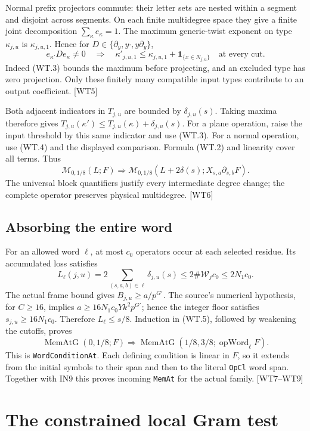 \documentclass[11pt,a4paper]{article}
\numberwithin{equation}{section}
\theoremstyle{remark}\newtheorem{remark}[theorem]{Remark}
\begin{document}
Normal prefix projectors commute: their letter sets are nested within a
segment and disjoint across segments. On each finite multidegree space
they give a finite joint decomposition $\sum_\kappa e_\kappa=1$.
The maximum generic-twist exponent on type $\kappa_{j,u}$ is
$\kappa_{j,u,1}$. Hence for
$D\in\{\partial_y,y\cdot,y\partial_y\}$,
\[
 e_{\kappa'}D e_\kappa\ne0
 \quad\Longrightarrow\quad
 \kappa'_{j,u,1}\le
 \kappa_{j,u,1}+\mathbf1_{\{x\in N_{j,u}\}}
 \quad\text{at every cut}.                         \tag{WT.4}
\]
Indeed (WT.3) bounds the maximum before projecting, and an excluded type
has zero projection. Only these finitely many compatible input types
contribute to an output coefficient. \textsf{[WT5]}

Both adjacent indicators in $T_{j,u}$ are bounded by
$\delta_{j,u}(s)$. Taking maxima therefore gives
$T_{j,u}(\kappa')\le T_{j,u}(\kappa)+\delta_{j,u}(s)$.
For a plane operation, raise the input threshold by this same indicator
and use (WT.3). For a normal operation, use (WT.4) and the displayed
comparison. Formula (WT.2) and linearity cover all terms. Thus
\[
 \mathcal M_{0,1/8}(L;F)
 \Longrightarrow
 \mathcal M_{0,1/8}
   (L+2\delta(s);X_{s,a}\partial_{s,b}F).
 \tag{WT.5}
\]
The universal block quantifiers justify every intermediate degree change;
the complete operator preserves physical multidegree. \textsf{[WT6]}

\subsection{Absorbing the entire word}

For an allowed word $\ell$, at most $c_0$ operators occur at each selected
residue. Its accumulated loss satisfies
\[
 L_\ell(j,u)=2\sum_{(s,a,b)\in\ell}\delta_{j,u}(s)
 \le2\#\mathcal W_jc_0\le2N_1c_0.
\]
The actual frame bound gives $B_{j,u}\ge a/p^{G'}$.
The source's numerical hypothesis, for $C\ge16$, implies
$a\ge16N_1c_0Yk^2p^{G'}$; hence the integer floor satisfies
$s_{j,u}\ge16N_1c_0$.
Therefore $L_\ell\le s/8$. Induction in (WT.5), followed by weakening
the cutoffs, proves
\[
 \operatorname{MemAtG}(0,1/8;F)
 \Longrightarrow
 \operatorname{MemAtG}(1/8,3/8;\operatorname{opWord}_\ell F).
 \tag{WT.6}
\]
This is \texttt{WordConditionAt}. Each defining condition is linear in
$F$, so it extends from the initial symbols to their span and then to
the literal \texttt{OpCl} word span. Together with IN9 this proves
incoming \texttt{MemAt} for the actual family. \textsf{[WT7--WT9]}

\section{The constrained local Gram test}
\label{sec:local-gram}
\end{document}
